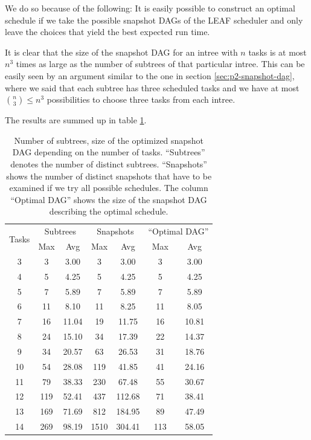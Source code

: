 We do so because of the following: It is easily possible to construct an optimal schedule if we take the possible snapshot DAGs of the LEAF scheduler and only leave the choices that yield the best expected run time.

It is clear that the size of the snapshot DAG for an intree with $n$ tasks is at most $n^3$ times as large as the number of subtrees of that particular intree. This can be easily seen by an argument similar to the one in section \ref{sec:p2-snapshot-dag}, where we said that each subtree has three scheduled tasks and we have at most $\binom{n}{3} \leq n^3$ possibilities to choose three tasks from each intree.


The results are summed up in table \ref{tab:num-subtrees-size-of-dags}.

\begin{table}[ht]
  \centering
  \begin{tabular}[ht]{ccccccc}
    \multirow{2}{*}{Tasks} & \multicolumn{2}{c}{Subtrees} & \multicolumn{2}{c}{Snapshots} & \multicolumn{2}{c}{``Optimal DAG''} \\
    & Max & Avg & Max & Avg & Max & Avg \\
    \hline
    3 & 3 & 3.00 & 3 & 3.00 & 3 & 3.00  \\
    4 & 5 & 4.25 & 5 & 4.25 & 5 & 4.25  \\
    5 & 7 & 5.89 & 7 & 5.89 & 7 & 5.89  \\
    6 & 11 & 8.10 & 11 & 8.25 & 11 & 8.05  \\
    7 & 16 & 11.04 & 19 & 11.75 & 16 & 10.81  \\
    8 & 24 &  15.10 & 34 & 17.39 & 22 & 14.37  \\
    9 & 34 &  20.57 & 63 & 26.53 & 31 & 18.76  \\
    10 & 54 &  28.08 & 119 & 41.85 & 41 & 24.16  \\
    11 & 79 &  38.33 & 230 & 67.48 & 55 & 30.67  \\
    12 & 119 & 52.41 & 437 & 112.68 & 71 & 38.41  \\
    13 & 169 &  71.69 & 812 & 184.95 & 89 & 47.49  \\
    14 & 269 &  98.19 & 1510 & 304.41 & 113 & 58.05  \\
  \end{tabular}
  \caption{Number of subtrees, size of the optimized snapshot DAG depending on the number of tasks. ``Subtrees'' denotes the number of distinct subtrees. ``Snapshots'' shows the number of distinct snapshots that have to be examined if we try all possible schedules. The column ``Optimal DAG'' shows the size of the snapshot DAG describing the optimal schedule.}
  \label{tab:num-subtrees-size-of-dags}
\end{table}

